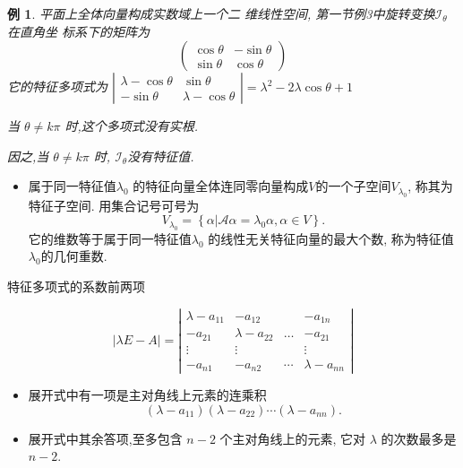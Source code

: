 \documentclass[13pt]{beamer}
\newtheorem{exa}{例}
\def\A{\mathscr{A}}
\begin{document}
\begin{frame}
\begin{exa}
平面上全体向量构成实数域上一个二
维线性空间, 第一节例3中旋转变换$\mathscr{I}_{\theta}$在直角坐
标系下的矩阵为
\[
\left(\begin{array}{cc}
\cos \theta & -\sin \theta \\
\sin \theta & \cos \theta
\end{array}\right)
\]
它的特征多项式为 $\left|\begin{array}{cc}\lambda-\cos \theta & \sin \theta \\ -\sin \theta & \lambda-\cos \theta\end{array}\right|=\lambda^{2}-2 \lambda \cos \theta+1$

当 $\theta \neq k \pi$ 时,这个多项式没有实根. 

因之,当 $\theta \neq k \pi$ 时, $\mathscr{I}_{\theta}$没有特征值.

\end{exa}
\end{frame}


\begin{frame}
\begin{itemize}
\item 属于同一特征值$\lambda_0$ 的特征向量全体连同零向量构成$V$的一个子空间$V_{\lambda_{0}}$, 称其为\alert{特征子空间}. 
用集合记号可号为 $$V_{\lambda_{0}}=\left\{\alpha |  \A \alpha=\lambda_{0} \alpha, \alpha \in V \right\}.$$
它的维数等于属于同一特征值$\lambda_{0}$ 的线性无关特征向量的最大个数, 称为特征值$\lambda_0$的\alert{几何重数}. 
\end{itemize}




\end{frame}

\begin{frame}{特征多项式的系数}{前两项}
{
$$|\lambda {E}-{A}|=\left|\begin{array}{cccc}\lambda-a_{11} & -a_{12} & & -a_{1n} \\ -a_{21} & \lambda-a_{22} & \dots & -a_{21} \\ \vdots & \vdots & & \vdots \\ -a_{n 1} & -a_{n 2} & \cdots & \lambda-a_{nn}\end{array}\right|$$

\begin{itemize}
	\item 展开式中有一项是主对角线上元素的连乘积 
	$$\left(\lambda-a_{11}\right)\left(\lambda-a_{22}\right) \cdots\left(\lambda-a_{nn}\right).$$
	\item 展开式中其余答项,至多包含 $n-2$ 个主对角线上的元素, 它对 $\lambda$ 的次数最多是 $n-2 .$
\end{itemize}
}
\end{frame}
\end{document}

